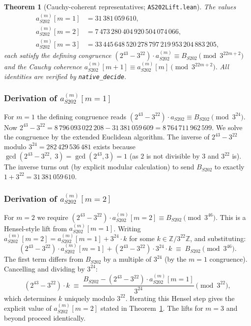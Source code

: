 \documentclass[11pt,a4paper]{article}
\theoremstyle{plain}
\newtheorem{theorem}{Theorem}[section]
\theoremstyle{definition}
\newcommand{\ZZ}{\mathbb{Z}}
\newcommand{\aS}{a_{S202}}
\newcommand{\aSat}{a_{S202}^{(m)}}
\begin{document}
\begin{theorem}[Cauchy-coherent representatives; \texttt{AS202Lift.lean}]
\label{thm:aSat-cauchy}
The values
\begin{align*}
  \aSat[m{=}1] &= 31\,381\,059\,610, \\
  \aSat[m{=}2] &= 7\,473\,280\,404\,920\,504\,074\,066, \\
  \aSat[m{=}3] &= 33\,445\,648\,520\,278\,797\,219\,953\,204\,883\,205,
\end{align*}
each satisfy the defining congruence
\(
   (2^{43} - 3^{22}) \cdot \aSat \equiv B_{S202} \pmod{3^{22m + 2}}
\)
and the Cauchy coherence
\(
   \aSat[m+1] \equiv \aSat[m] \pmod{3^{22 m + 2}}.
\)
All identities are verified by \texttt{native\_decide}.
\end{theorem}

\subsubsection*{Derivation of $\aSat[m=1]$}

For $m = 1$ the defining congruence reads
\(
  (2^{43} - 3^{22}) \cdot \aS \equiv B_{S202} \pmod{3^{24}}.
\)
Now $2^{43} - 3^{22} = 8\,796\,093\,022\,208 - 31\,381\,059\,609 = 8\,764\,711\,962\,599$.
We solve the congruence by the extended Euclidean algorithm. The
inverse of $2^{43} - 3^{22}$ modulo $3^{24} = 282\,429\,536\,481$
exists because
$\gcd(2^{43} - 3^{22}, \; 3) = \gcd(2^{43}, 3) = 1$ (as $2$ is not
divisible by $3$ and $3^{22}$ is). The inverse turns out (by
explicit modular calculation) to send $B_{S202}$ to exactly
$1 + 3^{22} = 31\,381\,059\,610$.

\subsubsection*{Derivation of $\aSat[m=2]$}

For $m = 2$ we require
\(
  (2^{43} - 3^{22}) \cdot \aSat[m{=}2] \equiv B_{S202} \pmod{3^{46}}.
\)
This is a Hensel-style lift from $\aSat[m=1]$. Writing
$\aSat[m=2] = \aSat[m=1] + 3^{24} \cdot k$ for some $k \in \ZZ/3^{22}\ZZ$,
and substituting:
\[
  (2^{43} - 3^{22}) \cdot \aSat[m=1] + (2^{43} - 3^{22}) \cdot 3^{24} \cdot k
  \;\equiv\; B_{S202} \pmod{3^{46}}.
\]
The first term differs from $B_{S202}$ by a multiple of $3^{24}$
(by the $m = 1$ congruence). Cancelling and dividing by $3^{24}$:
\[
  (2^{43} - 3^{22}) \cdot k \;\equiv\;
  \frac{B_{S202} - (2^{43} - 3^{22}) \cdot \aSat[m=1]}{3^{24}}
  \pmod{3^{22}},
\]
which determines $k$ uniquely modulo $3^{22}$. Iterating this
Hensel step gives the explicit value of $\aSat[m=2]$ stated in
Theorem~\ref{thm:aSat-cauchy}. The lifts for $m = 3$ and beyond
proceed identically.
\end{document}
